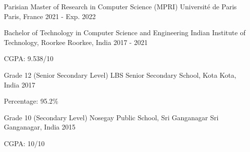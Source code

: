 

\begin{cventries}

  \cventry
    {Parisian Master of Research in Computer Science (MPRI)} %
    {Université de Paris} %
    {Paris, France} %
    {2021 - Exp. 2022} %
    {
    }

  \cventry
    {Bachelor of Technology in Computer Science and Engineering} %
    {Indian Institute of Technology, Roorkee} %
    {Roorkee, India} %
    {2017 - 2021} %
    {
      \begin{cvitems} %
        \item {CGPA: 9.538/10}
      \end{cvitems}
    }

  \cventry
    {Grade 12 (Senior Secondary Level)} %
    {LBS Senior Secondary School, Kota} %
    {Kota, India} %
    {2017} %
    {
      \begin{cvitems} %
        \item {Percentage: 95.2\%}
      \end{cvitems}
    }

  \cventry
    {Grade 10 (Secondary Level)} %
    {Nosegay Public School, Sri Ganganagar} %
    {Sri Ganganagar, India} %
    {2015} %
    {
      \begin{cvitems} %
        \item {CGPA: 10/10}
      \end{cvitems}
    }

\end{cventries}
